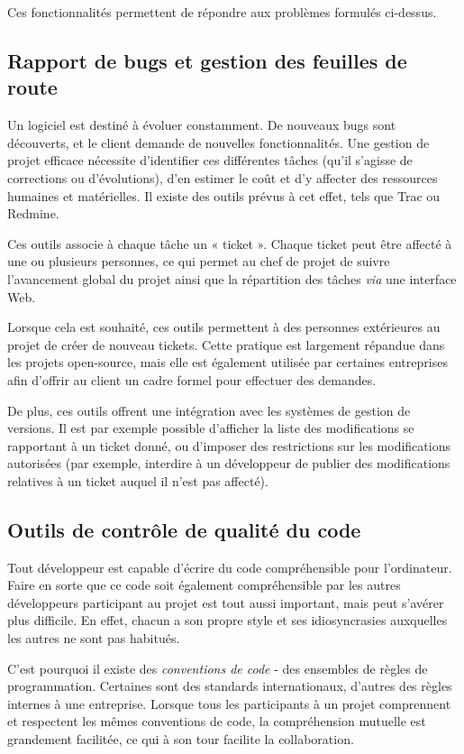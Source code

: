 Ces fonctionnalités permettent de répondre aux problèmes formulés ci-dessus.

\subsection{Rapport de bugs et gestion des feuilles de route}

Un logiciel est destiné à évoluer constamment. De nouveaux bugs sont découverts, et le client demande de nouvelles fonctionnalités. Une gestion de projet efficace nécessite d’identifier ces différentes tâches (qu’il s’agisse de corrections ou d’évolutions), d’en estimer le coût et d’y affecter des ressources humaines et matérielles. Il existe des outils prévus à cet effet, tels que Trac ou Redmine.

Ces outils associe à chaque tâche un « ticket ». Chaque ticket peut être affecté à une ou plusieurs personnes, ce qui permet au chef de projet de suivre l’avancement global du projet ainsi que la répartition des tâches \textit{via} une interface Web.

Lorsque cela est souhaité, ces outils permettent à des personnes extérieures au projet de créer de nouveau tickets. Cette pratique est largement répandue dans les projets open-source, mais elle est également utilisée par certaines entreprises afin d’offrir au client un cadre formel pour effectuer des demandes.

De plus, ces outils offrent une intégration avec les systèmes de gestion de versions. Il est par exemple possible d’afficher la liste des modifications se rapportant à un ticket donné, ou d’imposer des restrictions sur les modifications autorisées (par exemple, interdire à un développeur de publier des modifications relatives à un ticket auquel il n’est pas affecté).

\subsection{Outils de contrôle de qualité du code}

Tout développeur est capable d’écrire du code compréhensible pour l’ordinateur. Faire en sorte que ce code soit également compréhensible par les autres développeurs participant au projet est tout aussi important, mais peut s’avérer plus difficile. En effet, chacun a son propre style et ses idiosyncrasies auxquelles les autres ne sont pas habitués.

C’est pourquoi il existe des \textit{conventions de code} - des ensembles de règles de programmation. Certaines sont des standards internationaux, d’autres des règles internes à une entreprise. Lorsque tous les participants à un projet comprennent et respectent les mêmes conventions de code, la compréhension mutuelle est grandement facilitée, ce qui à son tour facilite la collaboration.

